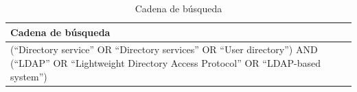 \begin{table}[H]
	\centering
	\caption{Cadena de búsqueda}
	\label{tab:cadena-busqueda}

	\renewcommand{\arraystretch}{1.2}
	\fontsize{9pt}{10pt}\selectfont

	\begin{tabularx}{\textwidth}{|X|}
		\hline
		\rowcolor{gray!15}
		\textbf{Cadena de búsqueda} \\
		\hline
		(``Directory service'' OR ``Directory services'' OR ``User directory'') AND (``LDAP'' OR ``Lightweight Directory Access Protocol'' OR ``LDAP-based system'')
		\\
		\hline
	\end{tabularx}
\end{table}

